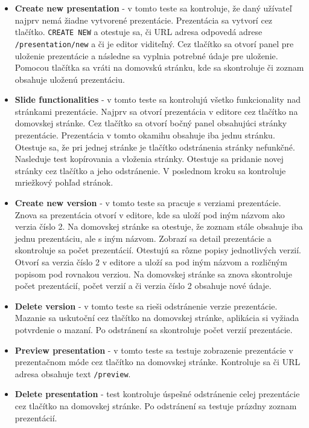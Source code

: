     \begin{itemize}
        \item\textbf{Create new presentation} - v tomto teste sa kontroluje, že daný užívateľ najprv nemá žiadne vytvorené prezentácie. Prezentácia sa vytvorí cez tlačítko. \texttt{CREATE NEW} a otestuje sa, či URL adresa odpovedá adrese \texttt{/presentation/new} a či je editor viditeľný. Cez tlačítko sa otvorí panel pre uloženie prezentácie a následne sa vyplnia potrebné údaje pre uloženie. Pomocou tlačítka sa vráti na domovskú stránku, kde sa skontroluje či zoznam obsahuje uloženú prezentáciu.
        
        \item\textbf{Slide functionalities} - v tomto teste sa kontrolujú všetko funkcionality nad stránkami prezentácie. Najprv sa otvorí prezentácia v editore cez tlačítko na domovskej stránke. Cez tlačítko sa otvorí bočný panel obsahujúci stránky prezentácie. Prezentácia v tomto okamihu obsahuje iba jednu stránku. Otestuje sa, že pri jednej stránke je tlačítko odstránenia stránky nefunkčné. Nasleduje test kopírovania a vloženia stránky. Otestuje sa pridanie novej stránky cez tlačítko a jeho odstránenie. V poslednom kroku sa kontroluje mriežkový pohľad stránok.
        
        \item\textbf{Create new version} - v tomto teste sa pracuje s verziami prezentácie. Znova sa prezentácia otvorí v editore, kde sa uloží pod iným názvom ako verzia číslo 2. Na domovskej stránke sa otestuje, že zoznam stále obsahuje iba jednu prezentáciu, ale s iným názvom. Zobrazí sa detail prezentácie a skontroluje sa počet prezentácií. Otestujú sa rôzne popisy jednotlivých verzií. Otvorí sa verzia číslo 2 v editore a uloží sa pod iným názvom a rozličným popisom pod rovnakou verziou. Na domovskej stránke sa znova skontroluje počet prezentácií, počet verzií a či verzia číslo 2 obsahuje nové údaje. 
        
        \item\textbf{Delete version} - v tomto teste sa rieši odstránenie verzie prezentácie. Mazanie sa uskutoční cez tlačítko na domovskej stránke, aplikácia si vyžiada potvrdenie o mazaní. Po odstránení sa skontroluje počet verzií prezentácie.
        
        \item\textbf{Preview presentation} - v tomto teste sa testuje zobrazenie prezentácie v prezentačnom móde cez tlačítko na domovskej stránke. Kontroluje sa či URL adresa obsahuje text \texttt{/preview}.
        
        \item\textbf{Delete presentation} - test kontroluje úspešné odstránenie celej prezentácie cez tlačítko na domovskej stránke. Po odstránení sa testuje prázdny zoznam prezentácií. 
    \end{itemize}
    
